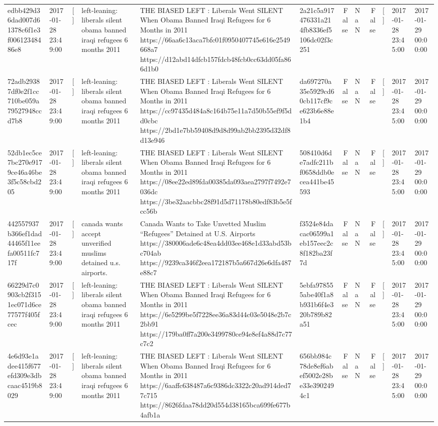 \begin{tabular}{llllllrlrlll}
edbb429d36dad007d61378c6f1e3f00612348486e8 & 2017-01-28 23:49:00 & [] & left-leaning: liberals silent obama banned iraqi refugees 6 months 2011 & THE BIASED LEFT : Liberals Went SILENT When Obama Banned Iraqi Refugees for 6 Months in 2011 https://66aa6c13aca7bfc01f0950407745e616e2549668a7 https://d12abd14dfcb157fdcb48fcb0cc63dd05fa866d1b0 & 2a21c5a917476331a214fb8336ef5106dc02f3c251 & False & NaN & False & [] & 2017-01-28 23:45:00 & 2017-01-29 00:00:00 \\
72adb29387df0e2f1cc710be059a79527948ccd7b8 & 2017-01-28 23:49:00 & [] & left-leaning: liberals silent obama banned iraqi refugees 6 months 2011 & THE BIASED LEFT : Liberals Went SILENT When Obama Banned Iraqi Refugees for 6 Months in 2011 https://cc97435d484a8c164b75e11a7d50b55ef9f5dd0cbc https://2bd1e7bb59408d9d8d99ab2bb2395d32df8d13e946 & da697270a35e5929cd60cb117cf9ce623b6e88e1b4 & False & NaN & False & [] & 2017-01-28 23:45:00 & 2017-01-29 00:00:00 \\
52db1ec5ce7bc270e9179ce46a46be3f5c58cbd205 & 2017-01-28 23:49:00 & [] & left-leaning: liberals silent obama banned iraqi refugees 6 months 2011 & THE BIASED LEFT : Liberals Went SILENT When Obama Banned Iraqi Refugees for 6 Months in 2011 https://08ee22ed89fda00385da093aea2797f7492e7036dc https://3be32aacbbc28f91d5d71178b80edf83b5e5fcc56b & 508410d6de7adfc211bf0658ddb0ecea441be45593 & False & NaN & False & [] & 2017-01-28 23:45:00 & 2017-01-29 00:00:00 \\
442557937b366ef1dad44465f11eefa00511fc717f & 2017-01-28 23:49:00 & [] & canada wants accept unverified muslims detained u.s. airports. & Canada Wants to Take Unvetted Muslim “Refugees” Detained at U.S. Airports https://380006ade6c48ea4dd03ee468e1d33abd53bc704ab https://9239ca346f2eea172187b5a667d26e6dfa487e88c7 & f3524e84dacac06599a1eb157eec2c8f182ba23f7d & False & NaN & False & [] & 2017-01-28 23:45:00 & 2017-01-29 00:00:00 \\
66229d7c0903cb2f3151ec071d6ce77577f405fcec & 2017-01-28 23:49:00 & [] & left-leaning: liberals silent obama banned iraqi refugees 6 months 2011 & THE BIASED LEFT : Liberals Went SILENT When Obama Banned Iraqi Refugees for 6 Months in 2011 https://6e5299be5f7228ee36a83d44c03e5048e2b7c2bb91 https://179ba0ff7a200e3499780ce94e8ef4a88d7c77c7c2 & 5ebfa978555abe40f1a8b931b6f4e320b789b82a51 & False & NaN & False & [] & 2017-01-28 23:45:00 & 2017-01-29 00:00:00 \\
4e6d93e1adee415f677efd309e3dbcaac4519b8029 & 2017-01-28 23:49:00 & [] & left-leaning: liberals silent obama banned iraqi refugees 6 months 2011 & THE BIASED LEFT : Liberals Went SILENT When Obama Banned Iraqi Refugees for 6 Months in 2011 https://6aaffc638487a6c9386dc3322c20ad914ded77c715 https://8626fdaa78dd20d554d38165bca699fe677b4afb1a & 656bb984c78de8ef6abef5002e28be33e3902494c1 & False & NaN & False & [] & 2017-01-28 23:45:00 & 2017-01-29 00:00:00 \\

\end{tabular}
